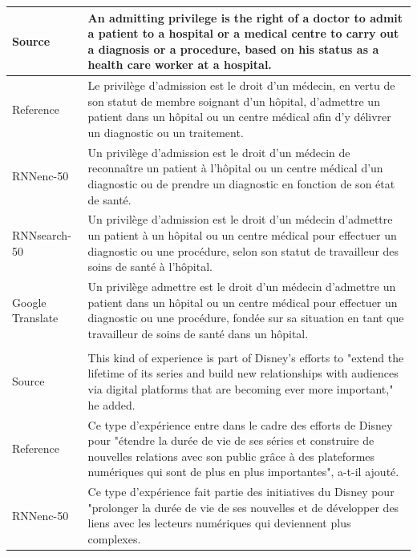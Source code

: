 \documentclass{article}
\begin{document}
\begin{table}[htp]
    \begin{minipage}{0.99\textwidth}
        \small
        \centering
        \begin{tabular}{p{1.9cm} | p{12cm}}
\hline Source & An admitting privilege is the right of a doctor to admit a patient to a hospital or a medical centre to carry out a diagnosis or a procedure, based on his status as a health care worker at a hospital.
\\
\hline Reference & Le privilège d'admission est le droit d'un m\'edecin, en vertu de son statut de membre soignant d'un h\^opital, d'admettre un patient dans un h\^opital ou un centre m\'edical afin d'y d\'elivrer un diagnostic ou un traitement.
\\
\hline RNNenc-50 & Un privilège d'admission est le droit d'un m\'edecin de reconnaître un patient à l'h\^opital ou un centre m\'edical d'un diagnostic ou de prendre un diagnostic en fonction de son \'etat de sant\'e.
\\
\hline RNNsearch-50 & Un privilège d'admission est le droit d'un m\'edecin d'admettre un patient à un h\^opital ou un centre m\'edical pour effectuer un diagnostic ou une proc\'edure, selon son statut de travailleur des soins de sant\'e à l'h\^opital.
\\
\hline Google \mbox{Translate} & Un privilège admettre est le droit d'un m\'edecin
d'admettre un patient dans un h\^opital ou un centre m\'edical pour effectuer un
diagnostic ou une proc\'edure, fond\'ee sur sa situation en tant que travailleur de
soins de sant\'e dans un h\^opital.
\\
\hline
\multicolumn{2}{c}{} \\
\hline Source & 
This kind of experience is part of Disney's efforts to "extend
the lifetime of its series and build new relationships with audiences via
digital platforms that are becoming ever more important," he added.
\\
\hline Reference & Ce type d'exp\'erience entre dans le cadre des efforts de Disney pour "\'etendre la dur\'ee de vie de ses s\'eries et construire de nouvelles relations avec son public grâce à des plateformes num\'eriques qui sont de plus en plus importantes", a-t-il ajout\'e.
\\
\hline RNNenc-50 & Ce type d'exp\'erience fait partie des initiatives du Disney pour "prolonger la dur\'ee de vie de ses nouvelles et de d\'evelopper des liens avec les lecteurs num\'eriques qui deviennent plus complexes.
\\

\end{tabular}
\end{minipage}
\end{table}
\end{document}
